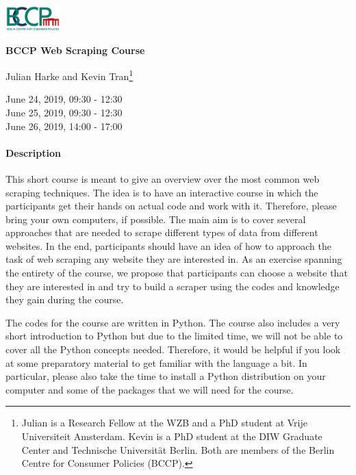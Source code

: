 \documentclass[a4paper]{article}
\begin{document}
\includegraphics[width=80px]{../misc/bccp_logo_transparent.png}
\vspace{1cm}

\begin{center}
\textbf{\Large BCCP Web Scraping Course} \vspace{0.3cm}

Julian Harke and Kevin Tran\footnote{Julian is a Research Fellow at the WZB and a PhD student at Vrije Universiteit Amsterdam. Kevin is a PhD student at the DIW Graduate Center and Technische Universit\"at Berlin. Both are members of the Berlin Centre for Consumer Policies (BCCP).} \vspace{0.3cm}

June 24, 2019, 09:30 - 12:30 \\
June 25, 2019, 09:30 - 12:30 \\
June 26, 2019, 14:00 - 17:00
\end{center}

\paragraph{Description} This short course is meant to give an overview over the most common web scraping techniques. The idea is to have an interactive course in which the participants get their hands on actual code and work with it. Therefore, please bring your own computers, if possible. The main aim is to cover several approaches that are needed to scrape different types of data from different websites. In the end, participants should have an idea of how to approach the task of web scraping any website they are interested in.
As an exercise spanning the entirety of the course, we propose that participants can choose a website that they are interested in and try to build a scraper using the codes and knowledge they gain during the course.

The codes for the course are written in Python. The course also includes a very short introduction to Python but due to the limited time, we will not be able to cover all the Python concepts needed. Therefore, it would be helpful if you look at some preparatory material to get familiar with the language a bit. In particular, please also take the time to install a Python distribution on your computer and some of the packages that we will need for the course.
\end{document}
